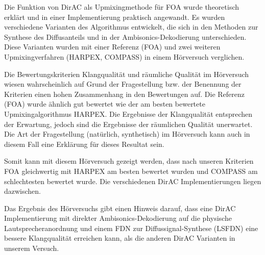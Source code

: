 Die Funktion von DirAC als Upmixingmethode für FOA wurde theoretisch erklärt und in einer Implementierung praktisch angewandt. Es wurden verschiedene Varianten des Algorithmus entwickelt, die sich in den Methoden zur Synthese des Diffusanteils und in der Ambisonics-Dekodierung unterschieden. Diese Varianten wurden mit einer Referenz (FOA) und zwei weiteren Upmixingverfahren (HARPEX, COMPASS) in einem Hörversuch verglichen.

Die Bewertungskriterien Klangqualität und räumliche Qualität im Hörversuch wiesen wahrscheinlich auf Grund der Fragestellung bzw. der Benennung der Kriterien einen hohen Zusammenhang in den Bewertungen auf. Die Referenz (FOA) wurde ähnlich gut bewertet wie der am besten bewertete Upmixingalgorithmus HARPEX. Die Ergebnisse der Klangqualität entsprechen der Erwartung, jedoch sind die Ergebnisse der räumlichen Qualität unerwartet. Die Art der Fragestellung (natürlich, synthetisch) im Hörversuch kann auch in diesem Fall eine Erklärung für dieses Resultat sein.

Somit kann mit diesem Hörversuch gezeigt werden, dass nach unseren Kriterien FOA gleichwertig mit HARPEX am besten bewertet wurden und COMPASS am schlechtesten bewertet wurde. Die verschiedenen DirAC Implementierungen liegen dazwischen.

Das Ergebnis des Hörversuchs gibt einen Hinweis darauf, dass eine DirAC Implementierung mit direkter Ambisonics-Dekodierung auf die physische Lautsprecheranordnung und einem FDN zur Diffussignal-Synthese (LSFDN) eine bessere Klangqualität erreichen kann, als die anderen DirAC Varianten in unserem Versuch.
